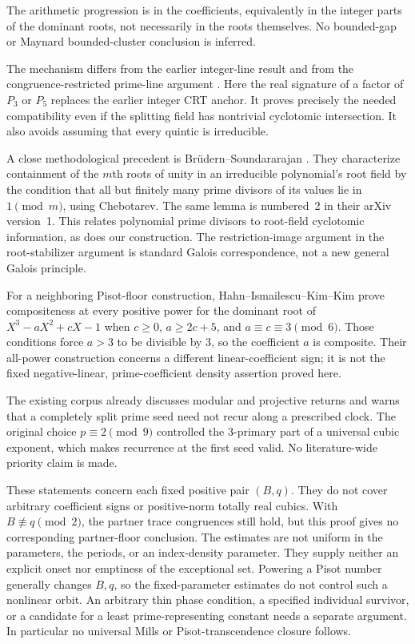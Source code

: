 \documentclass[11pt,a4paper]{article}
\theoremstyle{definition}\newtheorem{definition}[theorem]{Definition}
\theoremstyle{remark}\newtheorem{remark}[theorem]{Remark}
\begin{document}
The arithmetic progression is in the coefficients, equivalently
in the integer parts of the dominant roots, not necessarily in
the roots themselves.
No bounded-gap or Maynard bounded-cluster conclusion is inferred.

The mechanism differs from the earlier integer-line result
\cite{R08} and from the congruence-restricted prime-line argument
\cite{R10}. Here the real signature of a factor of $P_3$ or $P_5$
replaces the earlier integer CRT anchor.
It proves precisely the needed compatibility even if the
splitting field has nontrivial cyclotomic intersection.
It also avoids assuming that every quintic is irreducible.

A close methodological precedent is Br\"udern--Soundararajan
\cite[Section~2, Lemma~3]{R11-BS}.
They characterize containment of the $m$th roots of unity in an
irreducible polynomial's root field by the condition that all but
finitely many prime divisors of its values lie in $1\pmod m$,
using Chebotarev. The same lemma is numbered~2 in their
arXiv version~1.
This relates polynomial prime divisors to root-field cyclotomic
information, as does our construction.
The restriction-image argument in the root-stabilizer argument
is standard Galois correspondence, not a new general Galois principle.

For a neighboring Pisot-floor construction, Hahn--Ismailescu--Kim--Kim
\cite[Section~4, Theorem~4]{R11-HIKK} prove compositeness at every positive
power for the dominant root of $X^3-aX^2+cX-1$ when
$c\ge0$, $a\ge2c+5$, and $a\equiv c\equiv3\pmod6$.
Those conditions force $a>3$ to be divisible by $3$, so the coefficient
$a$ is composite. Their all-power construction concerns a different
linear-coefficient sign; it is not the fixed negative-linear,
prime-coefficient density assertion proved here.

The existing corpus \cite{K031} already discusses modular and
projective returns and warns that a completely split prime seed
need not recur along a prescribed clock.
The original choice $p\equiv2\pmod9$ controlled the $3$-primary part
of a universal cubic exponent, which makes recurrence at the
first seed valid. No literature-wide priority claim is made.

These statements concern each fixed positive pair $(B,q)$.
They do not cover arbitrary coefficient signs or positive-norm
totally real cubics. With $B\not\equiv q\pmod2$, the partner trace
congruences still hold, but this proof gives no corresponding
partner-floor conclusion.
The estimates are not uniform in the parameters, the periods,
or an index-density parameter. They supply neither an explicit
onset nor emptiness of the exceptional set.
Powering a Pisot number generally changes $B,q$, so the fixed-parameter
estimates do not control such a nonlinear orbit.
An arbitrary thin phase condition, a specified individual survivor,
or a candidate for a least prime-representing constant needs a
separate argument.
In particular no universal Mills or Pisot-transcendence closure follows.
\end{document}
